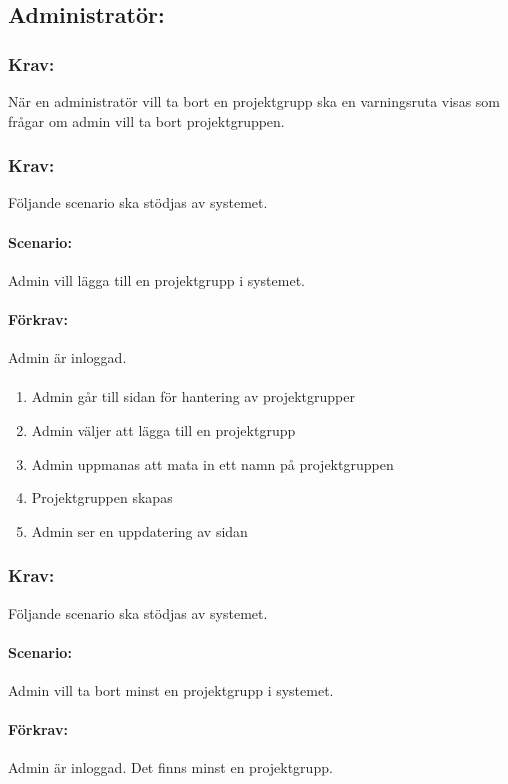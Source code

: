 \documentclass[paper=a4, fontsize=11pt,twoside]{article}
\begin{document}
	\subsection{Administratör:}
	\subsubsection{Krav:}
	När en administratör vill ta bort en projektgrupp ska en varningsruta visas som frågar om admin vill ta bort projektgruppen.
	
	\subsubsection{Krav:} Följande scenario ska stödjas av systemet.
	\paragraph{Scenario:}
	Admin vill lägga till en projektgrupp i systemet.
	\paragraph{Förkrav:}
	Admin är inloggad.
	\paragraph{}
	\begin{enumerate}
		\item Admin går till sidan för hantering av projektgrupper
		\item Admin väljer att lägga till en projektgrupp
		\item Admin uppmanas att mata in ett namn på projektgruppen
		\item Projektgruppen skapas
		\item Admin ser en uppdatering av sidan
	\end{enumerate}
	
	\subsubsection{Krav:} 
	Följande scenario ska stödjas av systemet.
	\paragraph{Scenario:}
	Admin vill ta bort minst en projektgrupp i systemet.
	\paragraph{Förkrav:}
	Admin är inloggad. Det finns minst en projektgrupp.
\end{document}
